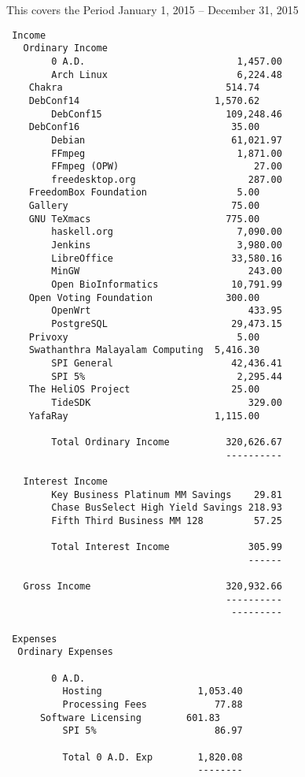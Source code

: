 \documentclass[letterpaper]{report}
\begin{document}
This covers the Period January 1, 2015 -- December 31, 2015

\begin{verbatim}
 Income
   Ordinary Income
        0 A.D.                           1,457.00
        Arch Linux                       6,224.48
	Chakra                             514.74
	DebConf14                        1,570.62
        DebConf15                      109,248.46
	DebConf16                           35.00
        Debian                          61,021.97
        FFmpeg                           1,871.00
        FFmpeg (OPW)                        27.00
        freedesktop.org                    287.00
	FreedomBox Foundation                5.00
	Gallery                             75.00
	GNU TeXmacs                        775.00
        haskell.org                      7,090.00
        Jenkins                          3,980.00
        LibreOffice                     33,580.16
        MinGW                              243.00
        Open BioInformatics             10,791.99
	Open Voting Foundation             300.00
        OpenWrt                            433.95
        PostgreSQL                      29,473.15
	Privoxy                              5.00
	Swathanthra Malayalam Computing  5,416.30
        SPI General                     42,436.41
        SPI 5%                           2,295.44
	The HeliOS Project                  25.00
        TideSDK                            329.00
	YafaRay                          1,115.00

        Total Ordinary Income          320,626.67
                                       ----------

   Interest Income
        Key Business Platinum MM Savings    29.81
        Chase BusSelect High Yield Savings 218.93
        Fifth Third Business MM 128         57.25

        Total Interest Income              305.99
                                           ------

   Gross Income                        320,932.66
                                       ----------
                                        ---------

 Expenses
  Ordinary Expenses

        0 A.D.
          Hosting                 1,053.40
          Processing Fees            77.88
	  Software Licensing        601.83
          SPI 5%                     86.97

          Total 0 A.D. Exp        1,820.08
                                  --------


\end{verbatim}
\end{document}
